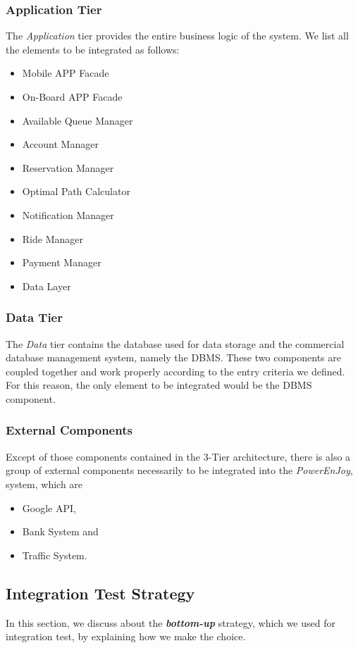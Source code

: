 \documentclass[a4paper,11pt]{article}
\begin{document}
		\subsubsection{Application Tier}
		The \textsl{Application} tier provides the entire business logic of the system. We list all the elements to be integrated as follows:
		\begin{itemize}
			\item Mobile APP Facade
			\item On-Board APP Facade
			\item Available Queue Manager
			\item Account Manager 
			\item Reservation Manager
			\item Optimal Path Calculator
			\item Notification Manager
			\item Ride Manager
			\item Payment Manager
			\item Data Layer
			
		\end{itemize}
		\subsubsection{Data Tier}
		The \textsl{Data} tier contains the database used for data storage and the commercial database management system, namely the DBMS. These two components are coupled together and work properly according to the entry criteria we defined. For this reason, the only element to be integrated would be the DBMS component. 
		\subsubsection{External Components}
		Except of those components contained in the 3-Tier architecture, there is also a group of external components necessarily to be integrated into the \textsl{PowerEnJoy}, system, which are
		\begin{itemize}
			\item Google API,
			\item Bank System and
			\item Traffic System.
		\end{itemize}
			
	\subsection{Integration Test Strategy}
	In this section, we discuss about the \textbf{\textsl{bottom-up}} strategy, which we used for integration test, by explaining how we make the choice. 
\end{document}
